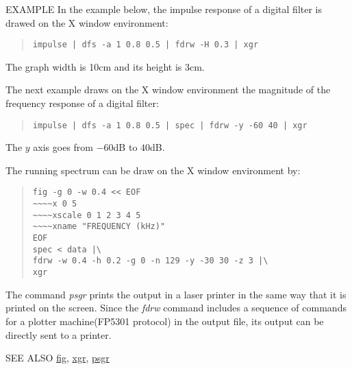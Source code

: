 \begin{qsection}{EXAMPLE}
In the example below, the impulse response of a digital filter is
drawed on the X window environment:
\begin{quote}
  \verb!impulse | dfs -a 1 0.8 0.5 | fdrw -H 0.3 | xgr!
\end{quote}
The graph width is 10cm and its height is 3cm.
\par
The next example draws on the X window environment the magnitude of
the frequency response of a digital filter:
\begin{quote}
  \verb!impulse | dfs -a 1 0.8 0.5 | spec | fdrw -y -60 40 | xgr!
\end{quote}
The $y$ axis goes from $-60$dB to $40$dB.
\par
The running spectrum can be draw on the X window environment by:
\begin{quote}
 \verb!fig -g 0 -w 0.4 << EOF ! \\
 \verb!~~~~x 0 5 !\\
 \verb!~~~~xscale 0 1 2 3 4 5 !\\
 \verb!~~~~xname "FREQUENCY (kHz)"!\\
 \verb!EOF!\\
 \verb!spec < data |\ !\\
 \verb!fdrw -w 0.4 -h 0.2 -g 0 -n 129 -y -30 30 -z 3 |\ !\\
 \verb!xgr !
\end{quote}
The command {\em psgr} prints the output in a laser printer in the
same way that it is printed on the screen.
Since the {\em fdrw} command includes a sequence of commands
for a plotter machine(FP5301 protocol) in the output file,
its output can be directly sent to a printer.
\end{qsection}

\begin{qsection}{SEE ALSO}
\hyperlink{fig}{fig},
\hyperlink{xgr}{xgr},
\hyperlink{psgr}{psgr}
\end{qsection}
